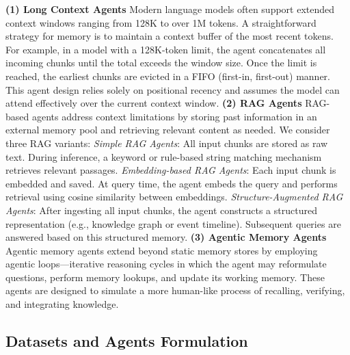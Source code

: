 \textbf{(1) Long Context Agents}
Modern language models often support extended context windows ranging from 128K to over 1M tokens. A straightforward strategy for memory is to maintain a context buffer of the most recent tokens. For example, in a model with a 128K-token limit, the agent concatenates all incoming chunks until the total exceeds the window size. Once the limit is reached, the earliest chunks are evicted in a FIFO (first-in, first-out) manner. This agent design relies solely on positional recency and assumes the model can attend effectively over the current context window. \textbf{(2) RAG Agents}
RAG-based agents address context limitations by storing past information in an external memory pool and retrieving relevant content as needed. We consider three RAG variants: \emph{Simple RAG Agents}: All input chunks are stored as raw text. During inference, a keyword or rule-based string matching mechanism retrieves relevant passages. \emph{Embedding-based RAG Agents}: Each input chunk is embedded and saved. At query time, the agent embeds the query and performs retrieval using cosine similarity between embeddings. \emph{Structure-Augmented RAG Agents}: After ingesting all input chunks, the agent constructs a structured representation (e.g., knowledge graph or event timeline). Subsequent queries are answered based on this structured memory. \textbf{(3) Agentic Memory Agents}
Agentic memory agents extend beyond static memory stores by employing agentic loops—iterative reasoning cycles in which the agent may reformulate questions, perform memory lookups, and update its working memory. These agents are designed to simulate a more human-like process of recalling, verifying, and integrating knowledge.

\subsection{Datasets and Agents Formulation}

